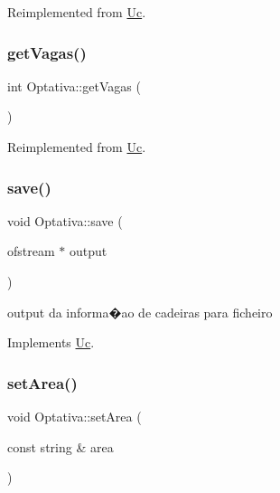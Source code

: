 Reimplemented from \hyperlink{class_uc_a5820a4fc8672679329f72467aa1599da}{Uc}.

\hypertarget{class_optativa_a675d4750bbe112a1b3d2c0b6bf64a94b}{}\label{class_optativa_a675d4750bbe112a1b3d2c0b6bf64a94b} 
\subsubsection{\texorpdfstring{get\+Vagas()}{getVagas()}}
{\footnotesize\ttfamily int Optativa\+::get\+Vagas (\begin{DoxyParamCaption}{ }\end{DoxyParamCaption})\hspace{0.3cm}{\ttfamily [virtual]}}



Reimplemented from \hyperlink{class_uc_aabb7272709731972c4bc574cfde28772}{Uc}.

\hypertarget{class_optativa_afcfc090c02bffe03c1316d1f00b0dca3}{}\label{class_optativa_afcfc090c02bffe03c1316d1f00b0dca3} 
\subsubsection{\texorpdfstring{save()}{save()}}
{\footnotesize\ttfamily void Optativa\+::save (\begin{DoxyParamCaption}\item[{ofstream $\ast$}]{output }\end{DoxyParamCaption})\hspace{0.3cm}{\ttfamily [virtual]}}

output da informa�ao de cadeiras para ficheiro 

Implements \hyperlink{class_uc_a6d5fafb63b88b75408dab0911276ce3f}{Uc}.

\hypertarget{class_optativa_ab672565bcd303892644444ed6c607ec5}{}\label{class_optativa_ab672565bcd303892644444ed6c607ec5} 
\subsubsection{\texorpdfstring{set\+Area()}{setArea()}}
{\footnotesize\ttfamily void Optativa\+::set\+Area (\begin{DoxyParamCaption}\item[{const string \&}]{area }\end{DoxyParamCaption})}

